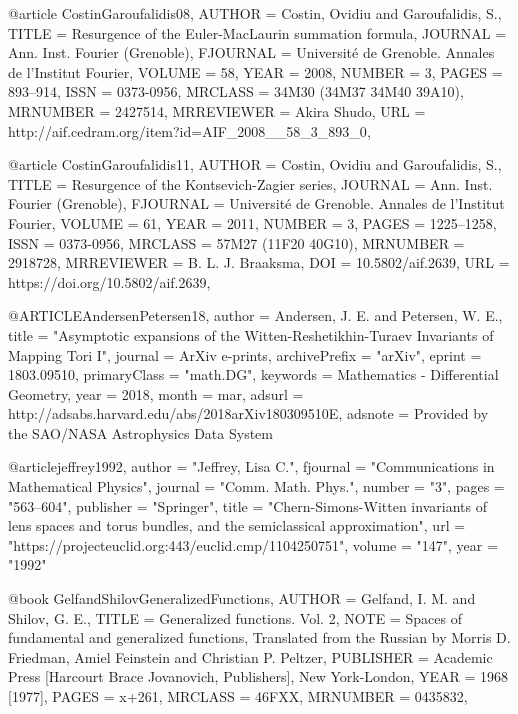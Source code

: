@article {CostinGaroufalidis08,
    AUTHOR = {Costin, Ovidiu and Garoufalidis, S.},
     TITLE = {Resurgence of the {E}uler-{M}ac{L}aurin summation formula},
   JOURNAL = {Ann. Inst. Fourier (Grenoble)},
  FJOURNAL = {Universit\'e de Grenoble. Annales de l'Institut Fourier},
    VOLUME = {58},
      YEAR = {2008},
    NUMBER = {3},
     PAGES = {893--914},
      ISSN = {0373-0956},
   MRCLASS = {34M30 (34M37 34M40 39A10)},
  MRNUMBER = {2427514},
MRREVIEWER = {Akira Shudo},
       URL = {http://aif.cedram.org/item?id=AIF_2008__58_3_893_0},
}

@article {CostinGaroufalidis11,
    AUTHOR = {Costin, Ovidiu and Garoufalidis, S.},
     TITLE = {Resurgence of the {K}ontsevich-{Z}agier series},
   JOURNAL = {Ann. Inst. Fourier (Grenoble)},
  FJOURNAL = {Universit\'e de Grenoble. Annales de l'Institut Fourier},
    VOLUME = {61},
      YEAR = {2011},
    NUMBER = {3},
     PAGES = {1225--1258},
      ISSN = {0373-0956},
   MRCLASS = {57M27 (11F20 40G10)},
  MRNUMBER = {2918728},
MRREVIEWER = {B. L. J. Braaksma},
       DOI = {10.5802/aif.2639},
       URL = {https://doi.org/10.5802/aif.2639},
}

@ARTICLE{AndersenPetersen18,
   author = {{Andersen}, J. E. and {Petersen}, W. E.},
    title = "{Asymptotic expansions of the Witten-Reshetikhin-Turaev Invariants of Mapping Tori I}",
  journal = {ArXiv e-prints},
archivePrefix = "arXiv",
   eprint = {1803.09510},
 primaryClass = "math.DG",
 keywords = {Mathematics - Differential Geometry},
     year = 2018,
    month = mar,
   adsurl = {http://adsabs.harvard.edu/abs/2018arXiv180309510E},
  adsnote = {Provided by the SAO/NASA Astrophysics Data System}
}

@article{jeffrey1992,
author = "Jeffrey, Lisa C.",
fjournal = "Communications in Mathematical Physics",
journal = "Comm. Math. Phys.",
number = "3",
pages = "563--604",
publisher = "Springer",
title = "Chern-Simons-Witten invariants of lens spaces and torus bundles, and the semiclassical approximation",
url = "https://projecteuclid.org:443/euclid.cmp/1104250751",
volume = "147",
year = "1992"
}

@book {GelfandShilovGeneralizedFunctions,
    AUTHOR = {Gelfand, I. M. and Shilov, G. E.},
     TITLE = {Generalized functions. {V}ol. 2},
      NOTE = {Spaces of fundamental and generalized functions,
              Translated from the Russian by Morris D. Friedman, Amiel
              Feinstein and Christian P. Peltzer},
 PUBLISHER = {Academic Press [Harcourt Brace Jovanovich, Publishers], New
              York-London},
      YEAR = {1968 [1977]},
     PAGES = {x+261},
   MRCLASS = {46FXX},
  MRNUMBER = {0435832},
}

